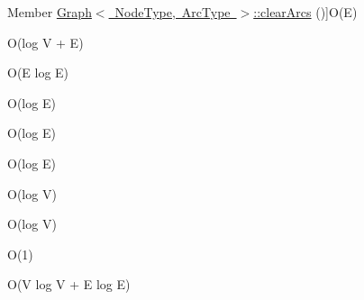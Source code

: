 \begin{DoxyRefList}
%
Member \mbox{\hyperlink{classGraph_a63f0ce1806df1c8070d997153363eecb}{Graph$<$ Node\+Type, Arc\+Type $>$\+:\+:clear\+Arcs}} ()]O(\+E)  
\item[\label{BigOh__BigOh000051}%
\Hypertarget{BigOh__BigOh000051}%
Member \mbox{\hyperlink{classGraph_a14def9e68896088fec7839e5da4fed27}{Graph$<$ Node\+Type, Arc\+Type $>$\+:\+:clear\+Arcs}} (Node\+Type $\ast$node)]O(log V + E)  
\item[\label{BigOh__BigOh000052}%
\Hypertarget{BigOh__BigOh000052}%
Member \mbox{\hyperlink{classGraph_a2d8ecb9c6768fff244b2be46319385cc}{Graph$<$ Node\+Type, Arc\+Type $>$\+:\+:clear\+Arcs}} (const std\+::string \&name)]O(\+E log E)  
\item[\label{BigOh__BigOh000053}%
\Hypertarget{BigOh__BigOh000053}%
Member \mbox{\hyperlink{classGraph_a9ca50139471975b82fdc6b1977bcfa4a}{Graph$<$ Node\+Type, Arc\+Type $>$\+:\+:contains\+Arc}} (Node\+Type $\ast$node1, Node\+Type $\ast$node2) const]O(log E)  
\item[\label{BigOh__BigOh000054}%
\Hypertarget{BigOh__BigOh000054}%
Member \mbox{\hyperlink{classGraph_a515e45aae316b581bf1cf168541f4f44}{Graph$<$ Node\+Type, Arc\+Type $>$\+:\+:contains\+Arc}} (const std\+::string \&node1, const std\+::string \&node2) const]O(log E)  
\item[\label{BigOh__BigOh000055}%
\Hypertarget{BigOh__BigOh000055}%
Member \mbox{\hyperlink{classGraph_acf7a659ddd8a143836b91b01c200ee8a}{Graph$<$ Node\+Type, Arc\+Type $>$\+:\+:contains\+Arc}} (Arc\+Type $\ast$arc) const]O(log E)  
\item[\label{BigOh__BigOh000056}%
\Hypertarget{BigOh__BigOh000056}%
Member \mbox{\hyperlink{classGraph_ac0beb77e8a238c2898ab851df71eeefe}{Graph$<$ Node\+Type, Arc\+Type $>$\+:\+:contains\+Node}} (const std\+::string \&name) const]O(log V)  
\item[\label{BigOh__BigOh000057}%
\Hypertarget{BigOh__BigOh000057}%
Member \mbox{\hyperlink{classGraph_a4f540ebc07c4e46a0bb7fee76a93386c}{Graph$<$ Node\+Type, Arc\+Type $>$\+:\+:contains\+Node}} (Node\+Type $\ast$node) const]O(log V)  
\item[\label{BigOh__BigOh000092}%
\Hypertarget{BigOh__BigOh000092}%
Member \mbox{\hyperlink{classGraph_afcdf62cae5d7e50644957d66f886742d}{Graph$<$ Node\+Type, Arc\+Type $>$\+:\+:end}} () const]O(1)  
\item[\label{BigOh__BigOh000058}%
\Hypertarget{BigOh__BigOh000058}%
Member \mbox{\hyperlink{classGraph_a6bec43eb3dfdf3d23eb328b406edf44a}{Graph$<$ Node\+Type, Arc\+Type $>$\+:\+:equals}} (const Graph$<$ Node\+Type, Arc\+Type $>$ \&graph2) const]O(V log V + E log E)  

\end{DoxyRefList}
